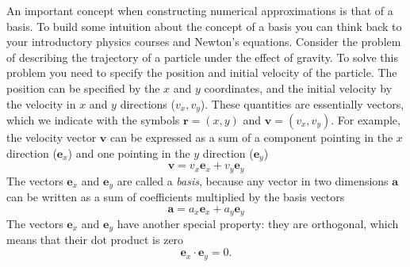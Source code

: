 \documentclass[../Main/chem371-notes.tex]{subfiles}
\begin{document}
An important concept when constructing numerical approximations is that of a basis.
To build some intuition about the concept of a basis you can think back to your introductory physics courses and Newton's equations.
Consider the problem of describing the trajectory of a particle under the effect of gravity.
To solve this problem you need to specify the position and initial velocity of the particle.
The position can be specified by the $x$ and $y$ coordinates, and the initial velocity by the velocity in $x$ and $y$ directions ($v_x, v_y$).
These quantities are essentially vectors, which we indicate with the symbols $\mathbf{r} = (x,y)$ and $\mathbf{v} = (v_x,v_y)$. For example, the velocity vector $\mathbf{v}$ can be expressed as a sum of a component pointing in the $x$ direction ($\mathbf{e}_x$) and one pointing in the $y$ direction ($\mathbf{e}_y$)
\begin{equation}
\mathbf{v} = v_x \mathbf{e}_x + v_y \mathbf{e}_y
\end{equation}
The vectors $\mathbf{e}_x$ and $\mathbf{e}_y$ are called a \emph{basis}, because any vector in two dimensions $\mathbf{a}$ can be written as a sum of coefficients multiplied by the basis vectors
\begin{equation}
\mathbf{a} = a_x \mathbf{e}_x + a_y \mathbf{e}_y
\end{equation}
The vectors $\mathbf{e}_x$ and $\mathbf{e}_y$ have another special property: they are orthogonal, which means that their dot product is zero
\begin{equation}
 \mathbf{e}_x \cdot \mathbf{e}_y = 0.
\end{equation}
\end{document}
